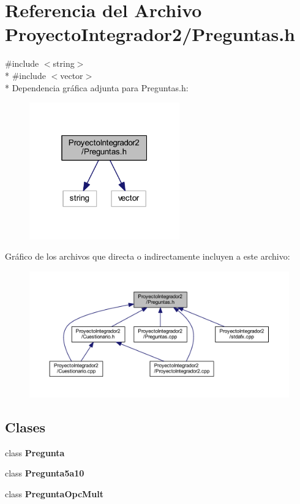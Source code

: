 \section{Referencia del Archivo Proyecto\-Integrador2/\-Preguntas.h}
\label{_preguntas_8h}
{\ttfamily \#include $<$string$>$}\\*
{\ttfamily \#include $<$vector$>$}\\*
Dependencia gráfica adjunta para Preguntas.\-h\-:
\nopagebreak
\begin{figure}[H]
\begin{center}
\leavevmode
\includegraphics[width=184pt]{_preguntas_8h__incl}
\end{center}
\end{figure}
Gráfico de los archivos que directa o indirectamente incluyen a este archivo\-:
\nopagebreak
\begin{figure}[H]
\begin{center}
\leavevmode
\includegraphics[width=350pt]{_preguntas_8h__dep__incl}
\end{center}
\end{figure}
\subsection*{Clases}
\begin{DoxyCompactItemize}
\item 
class {\bf Pregunta}
\item 
class {\bf Pregunta5a10}
\item 
class {\bf Pregunta\-Opc\-Mult}
\end{DoxyCompactItemize}
